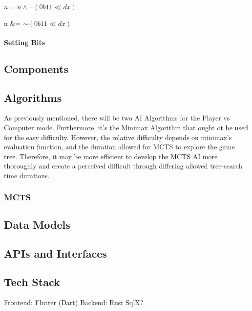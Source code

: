 \begin{center}
    \begin{math}
        n = n \land \neg(0b11 \ll dx)
    \end{math}
\end{center}

    n \&= $\sim (0b11 \ll dx)$
\paragraph{Setting Bits}
\subsection{Components}
\subsection{Algorithms}
As previously mentioned, there will be two AI Algorithms for the Player vs Computer mode.
Furthermore, it's the Minimax Algorithm that ought ot be used for the easy difficulty. However,
the relative difficulty depends on minimax's evaluation function, and the duration allowed for 
MCTS to explore the game tree. Therefore, it may be more efficient to develop the MCTS AI more thoroughly and create 
a perceived difficult through differing allowed tree-search time durations. 

\subsubsection{MCTS}

\subsection{Data Models}
\subsection{APIs and Interfaces}

\subsection{Tech Stack}
Frontend: Flutter (Dart) \newline
Backend: Rust SqlX?
